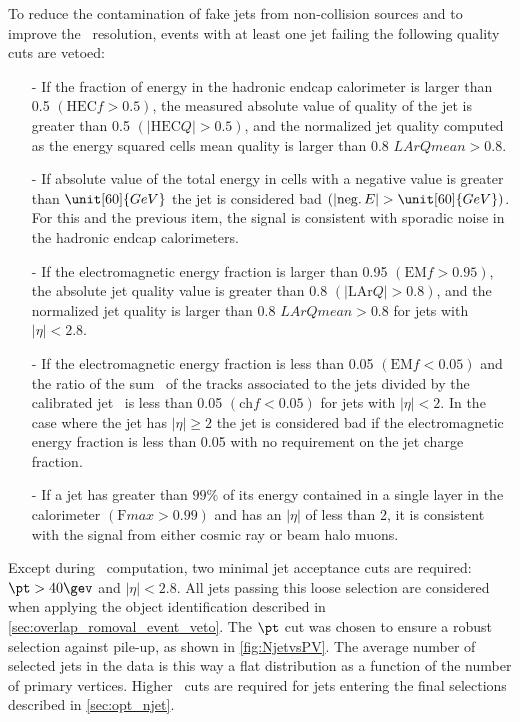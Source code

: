 To reduce the contamination of fake jets from non-collision sources and to improve the \MET\ resolution, events with at
least one jet failing the following quality cuts  \cite{JetCleaning} are vetoed:
\begin{itemize}\itemsep0.1cm
\item[-] If the fraction of energy in the hadronic endcap calorimeter is
  larger than 0.5 $\left(\mathrm{HEC}f > 0.5\right)$, the measured absolute
  value of quality of the jet is greater than 0.5 $\left(|\mathrm{HEC}Q| > 0.5\right)$,
 and the normalized jet quality computed as the energy squared cells mean
quality is larger than 0.8 $LArQmean > 0.8$.
\item[-] If absolute value of the total energy in cells with a negative value
  is greater than $\unit[60]{GeV}$ the jet is considered bad
  $\left(|\mathrm{neg.}\,E| > \unit[60]{GeV}\right)$.
  For this and the previous item, the signal is consistent with sporadic
  noise in the hadronic endcap calorimeters.
\item[-] If the electromagnetic energy fraction is larger than 0.95
  $\left(\mathrm{EM}f > 0.95\right)$, the absolute jet quality value is greater than
  0.8 $\left(|\mathrm{LAr}Q| > 0.8\right)$, and the normalized jet quality is larger than 0.8
 $LArQmean > 0.8$ for jets with $|\eta| < 2.8$.
\item[-] If the electromagnetic energy fraction is less than 0.05
  $\left(\mathrm{EM}f < 0.05\right)$ and the ratio of the sum \pt\ of the
  tracks associated to the jets divided by the calibrated jet \pt\ is less than 0.05
  $\left(\mathrm{ch}f < 0.05\right)$ for jets with $|\eta| < 2$.
  In the case where the jet has $|\eta| \ge 2$ the jet is considered bad if
  the electromagnetic energy fraction is less than 0.05 with no requirement on
  the jet charge fraction.
\item[-] If a jet has greater than $99\%$ of its energy contained in a
  single layer in the calorimeter $(\mathrm{F}max > 0.99)$
   and has an $|\eta|$ of less than 2, it is consistent with the signal
  from either cosmic ray or beam halo muons.
\end{itemize}

Except during \etmiss\ computation, two minimal jet acceptance cuts are required: $\pt > 40 \gev$ and
$|\eta| < 2.8$. All jets passing this loose selection are considered when applying the object identification described in \Sec \ref{sec:overlap_romoval_event_veto}. The $\pt$ cut was chosen to ensure a robust selection against pile-up, as shown in \Fig \ref{fig:NjetvsPV}. The average number of selected jets in the data is this way a flat distribution as a function of the number of primary vertices.
Higher \pt\ cuts are required for jets entering the final selections described in \Sec \ref{sec:opt_njet}.

